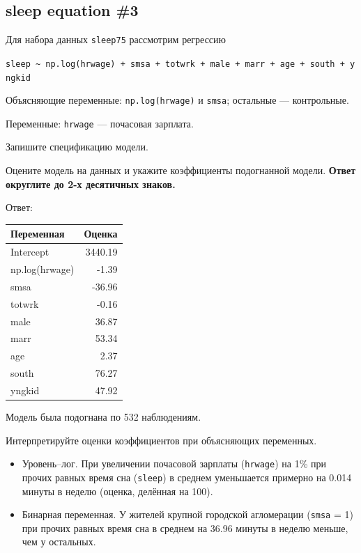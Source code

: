 \documentclass[
  russian,
]{article}
\newcounter{none} %
\providecommand{\tightlist}{%
  \setlength{\itemsep}{0pt}\setlength{\parskip}{0pt}}
\begin{document}
\subsection{sleep equation \#3}\label{sleep-equation-3}

Для набора данных \texttt{sleep75} рассмотрим регрессию

\texttt{sleep\ \textasciitilde{}\ np.log(hrwage)\ +\ smsa\ +\ totwrk\ +\ male\ +\ marr\ +\ age\ +\ south\ +\ yngkid}

Объясняющие переменные: \texttt{np.log(hrwage)} и \texttt{smsa};
остальные --- контрольные.

Переменные: \texttt{hrwage} --- почасовая зарплата.

Запишите спецификацию модели.

Оцените модель на данных и укажите коэффициенты подогнанной модели.
\textbf{Ответ округлите до 2-х десятичных знаков.}

Ответ:

{\def\LTcaptype{none} %
\begin{longtable}[]{@{}lr@{}}
\toprule\noalign{}
Переменная & Оценка \\
\midrule\noalign{}
\endhead
\bottomrule\noalign{}
\endlastfoot
Intercept & 3440.19 \\
np.log(hrwage) & -1.39 \\
smsa & -36.96 \\
totwrk & -0.16 \\
male & 36.87 \\
marr & 53.34 \\
age & 2.37 \\
south & 76.27 \\
yngkid & 47.92 \\
\end{longtable}
}

Модель была подогнана по 532 наблюдениям.

Интерпретируйте оценки коэффициентов при объясняющих переменных.

\begin{tcolorbox}[enhanced jigsaw, arc=.35mm, bottomrule=.15mm, bottomtitle=1mm, breakable, colback=white, colbacktitle=quarto-callout-tip-color!10!white, colframe=quarto-callout-tip-color-frame, coltitle=black, left=2mm, leftrule=.75mm, opacityback=0, opacitybacktitle=0.6, rightrule=.15mm, title=\textcolor{quarto-callout-tip-color}{\faLightbulb}\hspace{0.5em}{Ответ}, titlerule=0mm, toprule=.15mm, toptitle=1mm]

\begin{itemize}
\tightlist
\item
  Уровень--лог. При увеличении почасовой зарплаты (\texttt{hrwage}) на
  1\% при прочих равных время сна (\texttt{sleep}) в среднем уменьшается
  примерно на 0.014 минуты в неделю (оценка, делённая на 100).
\item
  Бинарная переменная. У жителей крупной городской агломерации
  (\texttt{smsa} = 1) при прочих равных время сна в среднем на 36.96
  минуты в неделю меньше, чем у остальных.
\end{itemize}

\end{tcolorbox}
\end{document}
